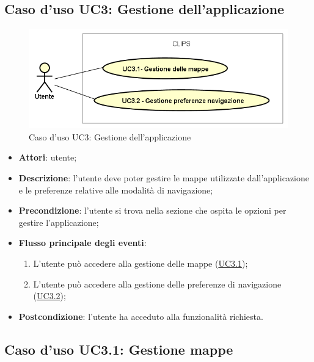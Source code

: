 \documentclass[../AnalisiDeiRequisiti.tex]{subfiles}
\begin{document}
\subsection{Caso d'uso UC3: Gestione dell'applicazione}

        \begin{figure}[H]
            \centering
            \includegraphics[scale=0.95, width=\textwidth]{img/UC3.png}
            \caption{Caso d'uso UC3: Gestione dell'applicazione}\label{fig:UC3} 
        \end{figure}
\begin{itemize}
\item \textbf{Attori}: utente;
\item \textbf{Descrizione}: l'utente deve poter gestire le mappe utilizzate dall'applicazione e le preferenze relative alle modalità di navigazione; 
      \item \textbf{Precondizione}: l'utente si trova nella sezione che ospita le opzioni per gestire l'applicazione;

        \item \textbf{Flusso principale degli eventi}:
          \begin{enumerate}
          \item L'utente può accedere alla gestione delle mappe (\hyperlink{UC3.1}{UC3.1});
          \item L'utente può accedere alla gestione delle preferenze di navigazione (\hyperlink{UC3.2}{UC3.2});

      \end{enumerate}
    \item \textbf{Postcondizione}: l'utente ha acceduto alla funzionalità richiesta.
  \end{itemize}
\hypertarget{UC3.1}{}
\subsection{Caso d'uso UC3.1: Gestione mappe}
\end{document}
